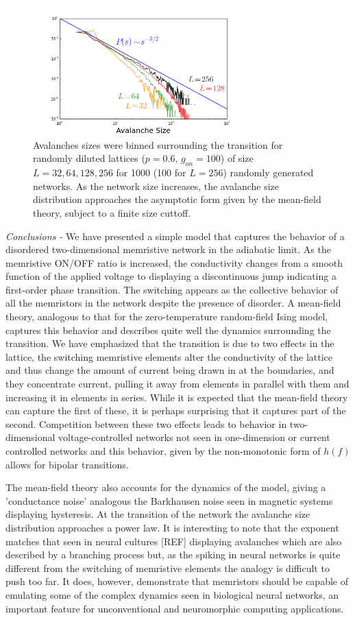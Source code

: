 \documentclass[aps,prl,reprint,groupedaddress]{revtex4-1}
\begin{document}
\begin{figure}
\includegraphics[width=8.3cm]{Avalanche_Size_Dist-2.png}
\caption{Avalanches sizes were binned surrounding the transition for randomly
diluted lattices ($p=0.6,\,g_{on}=100$) of size $L=32, 64, 128, 256$ for 1000
(100 for $L=256$) randomly generated networks.  As the network size increases,
the avalanche size distribution approaches the asymptotic form given by the
mean-field theory, subject to a finite size cuttoff.
\label{Avalanche_fig}}
\end{figure}

{\it Conclusions - } We have presented a simple model that captures the behavior of a disordered two-dimensional memristive
network in the adiabatic limit.  As the memristive ON/OFF ratio is increased,
the conductivity changes from a smooth function of the applied voltage to
displaying a discontinuous jump indicating a first-order phase transition. The switching appears as the collective behavior of all the memristors 
in the network despite the presence of disorder. 
A mean-field theory, analogous to that for the zero-temperature random-field Ising model, captures this behavior and describes quite well the dynamics
surrounding the transition.  We have emphasized that the transition is
due to two effects in the lattice, the switching memristive elements alter the
conductivity of the lattice and thus change the amount of current being drawn
in at the boundaries, and they concentrate current, pulling it away from
elements in parallel with them and increasing it in elements in series. While
it is expected that the mean-field theory can capture the first of these, it
is perhaps surprising that it captures part of the second.  Competition
between these two effects leads to behavior in two-dimensional 
voltage-controlled networks not seen in one-dimension or current controlled
networks and this behavior, given by the non-monotonic form of $h(f)$ allows
for bipolar transitions.

The mean-field theory also accounts for the dynamics of the model, giving
a 'conductance noise' analogous the Barkhausen noise seen in magnetic systems
displaying hysteresis.  At the transition of the network the avalanche
size distribution approaches a power law.  It is interesting to note that
the exponent matches that seen in neural cultures [REF] displaying avalanches which
are also described by a branching process but, as the spiking in neural
networks is quite different from the switching of memristive elements the
analogy is difficult to push too far.  It does, however, demonstrate that
memristors should be capable of emulating some of the complex dynamics seen in biological
neural networks, an important feature for unconventional and neuromorphic computing applications. 
\end{document}
